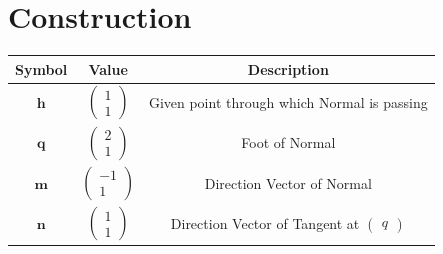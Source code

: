 \documentclass[journal,10pt,twocolumn]{article}
\let\vec\mathbf
\newcommand{\myvec}[1]{\ensuremath{\begin{pmatrix}#1\end{pmatrix}}}
\begin{document}
\section*{\large Construction}
{
\setlength\extrarowheight{5pt}
\begin{tabular}{|c|c|c|}
	\hline
	\textbf{Symbol}&\textbf{Value}&\textbf{Description}\\[5pt]
	\hline
	$\vec{h}$&$\myvec{1 \\ 1}$&Given point through which Normal is passing\\[5pt]
	\hline
	$\vec{q}$&$\myvec{2 \\ 1}$&Foot of Normal\\[5pt]
	\hline
	$\vec{m}$ & $\myvec{-1 \\ 1}$ & Direction Vector of Normal\\[5pt]
	\hline
	$\vec{n}$ & $\myvec{1 \\ 1}$ & Direction Vector of Tangent at $\myvec{q}$\\
	\hline
\end{tabular}
}
\end{document}
